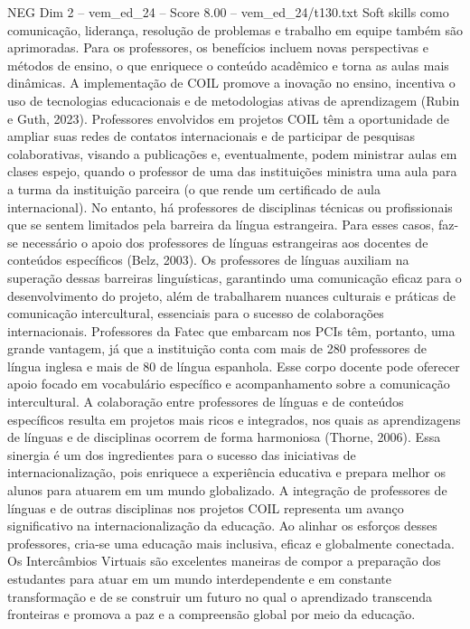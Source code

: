 \begin{textsample}{NEG Dim 2 – vem\_ed\_24 – Score 8.00 – vem\_ed\_24/t130.txt}
Soft skills como comunicação, liderança, resolução de problemas e trabalho em equipe também são aprimoradas.
Para os professores, os benefícios incluem novas perspectivas e métodos de ensino, o que enriquece o conteúdo acadêmico e torna as aulas mais dinâmicas.
A implementação de COIL promove a inovação no ensino, incentiva o uso de tecnologias educacionais e de metodologias ativas de aprendizagem (Rubin e Guth, 2023).
Professores envolvidos em projetos COIL têm a oportunidade de ampliar suas redes de contatos internacionais e de participar de pesquisas colaborativas, visando a publicações e, eventualmente, podem ministrar aulas em clases espejo, quando o professor de uma das instituições ministra uma aula para a turma da instituição parceira (o que rende um certificado de aula internacional).
No entanto, há professores de disciplinas técnicas ou profissionais que se sentem limitados pela barreira da língua estrangeira.
Para esses casos, faz-se necessário o apoio dos professores de línguas estrangeiras aos docentes de conteúdos específicos (Belz, 2003).
Os professores de línguas auxiliam na superação dessas barreiras linguísticas, garantindo uma comunicação eficaz para o desenvolvimento do projeto, além de trabalharem nuances culturais e práticas de comunicação intercultural, essenciais para o sucesso de colaborações internacionais.
Professores da Fatec que embarcam nos PCIs têm, portanto, uma grande vantagem, já que a instituição conta com mais de 280 professores de língua inglesa e mais de 80 de língua espanhola.
Esse corpo docente pode oferecer apoio focado em vocabulário específico e acompanhamento sobre a comunicação intercultural.
A colaboração entre professores de línguas e de conteúdos específicos resulta em projetos mais ricos e integrados, nos quais as aprendizagens de línguas e de disciplinas ocorrem de forma harmoniosa (Thorne, 2006).
Essa sinergia é um dos ingredientes para o sucesso das iniciativas de internacionalização, pois enriquece a experiência educativa e prepara melhor os alunos para atuarem em um mundo globalizado.
A integração de professores de línguas e de outras disciplinas nos projetos COIL representa um avanço significativo na internacionalização da educação.
Ao alinhar os esforços desses professores, cria-se uma educação mais inclusiva, eficaz e globalmente conectada.
Os Intercâmbios Virtuais são excelentes maneiras de compor a preparação dos estudantes para atuar em um mundo interdependente e em constante transformação e de se construir um futuro no qual o aprendizado transcenda fronteiras e promova a paz e a compreensão global por meio da educação.

\end{textsample}
